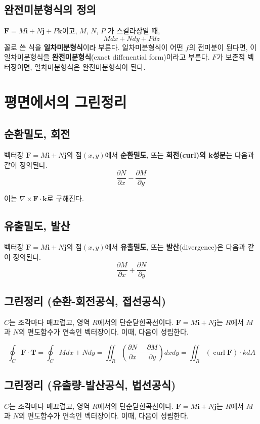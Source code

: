 \documentclass[chapter, oneside]{oblivoir}
\newcommand{\term}[1]{\textbf{#1}}
\begin{document}
\subsection{완전미분형식의 정의}
$\textbf{F}=M\textbf{i}+N\textbf{j}+P\textbf{k}$이고, $M$, $N$, $P$ 가 스칼라장일 때, 
$$ M dx + N dy + P dz$$
꼴로 쓴 식을 \term{일차미분형식}이라 부른다. 
일차미분형식이 어떤 $f$의 전미분이 된다면, 이 일차미분형식을 \term{완전미분형식}(exact diffenential form)이라고 부른다.
 $F$가 보존적 벡터장이면, 일차미분형식은 완전미분형식이 된다.


\section{평면에서의 그린정리}
\subsection{순환밀도, 회전 }
벡터장 $\textbf{F}=M\textbf{i}+N\textbf{j}$의 점$(x,y)$에서 \term{순환밀도}, 또는 \term{회전(curl)의 k성분}는 다음과 같이 정의된다.
$$\frac{\partial N}{\partial x} - \frac{\partial M}{\partial y} $$

이는 $\nabla \times \textbf{F} \cdot \textbf{k}$로 구해진다.

\subsection{유출밀도, 발산}
벡터장 $\textbf{F}=M\textbf{i}+N\textbf{j}$의 점$(x,y)$에서 \term{유출밀도}, 또는 \term{발산}(divergence)은 다음과 같이 정의된다.
$$ \frac{\partial M}{\partial x} + \frac{\partial N}{\partial y}$$

\subsection{그린정리 (순환-회전공식, 접선공식)}
$C$는 조각마다 매끄럽고, 영역 $R$에서의 단순닫힌곡선이다.
$\textbf{F}=M\textbf{i}+N\textbf{j}$는 $R$에서  $M$과 $N$의 편도함수가 연속인 벡터장이다.
이때, 다음이 성립한다.

$$ 
\oint_C \textbf{F} \cdot \textbf{T} 
= \oint_C M dx + N dy = \iint_R \left( \frac{\partial N}{\partial x} - \frac{\partial M}{\partial y} \right) dx dy 
= \iint_R \left( \operatorname{curl} \textbf{F} \right)\cdot k dA $$

\subsection{그린정리 (유출량-발산공식, 법선공식)}
$C$는 조각마다 매끄럽고, 영역 $R$에서의 단순닫힌곡선이다.
$\textbf{F}=M\textbf{i}+N\textbf{j}$는 $R$에서  $M$과 $N$의 편도함수가 연속인 벡터장이다.
이때, 다음이 성립한다.
\end{document}
